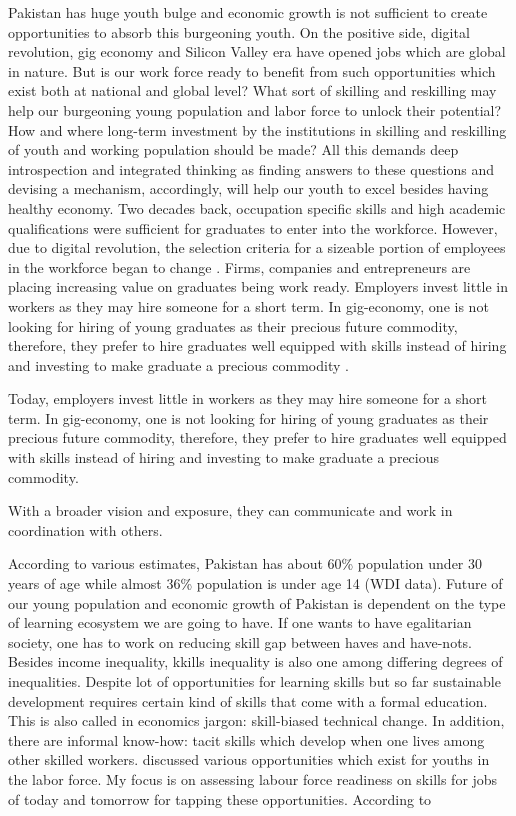 \documentclass[
]{aft}
\begin{document}
Pakistan has huge youth bulge and economic growth is not sufficient to
create opportunities to absorb this burgeoning youth. On the positive
side, digital revolution, gig economy and Silicon Valley era have opened
jobs which are global in nature. But is our work force ready to benefit
from such opportunities which exist both at national and global level?
What sort of skilling and reskilling may help our burgeoning young
population and labor force to unlock their potential? How and where
long-term investment by the institutions in skilling and reskilling of
youth and working population should be made? All this demands deep
introspection and integrated thinking as finding answers to these
questions and devising a mechanism, accordingly, will help our youth to
excel besides having healthy economy. Two decades back, occupation
specific skills and high academic qualifications were sufficient for
graduates to enter into the workforce. However, due to digital
revolution, the selection criteria for a sizeable portion of employees
in the workforce began to change \citet{assessme2015} . Firms, companies
and entrepreneurs are placing increasing value on graduates being work
ready. Employers invest little in workers as they may hire someone for a
short term. In gig-economy, one is not looking for hiring of young
graduates as their precious future commodity, therefore, they prefer to
hire graduates well equipped with skills instead of hiring and investing
to make graduate a precious commodity \citet{akdere2018} .

Today, employers invest little in workers as they may hire someone for a
short term. In gig-economy, one is not looking for hiring of young
graduates as their precious future commodity, therefore, they prefer to
hire graduates well equipped with skills instead of hiring and investing
to make graduate a precious commodity.

With a broader vision and exposure, they can communicate and work in
coordination with others.

According to various estimates, Pakistan has about 60\% population under
30 years of age while almost 36\% population is under age 14 (WDI data).
Future of our young population and economic growth of Pakistan is
dependent on the type of learning ecosystem we are going to have. If one
wants to have egalitarian society, one has to work on reducing skill gap
between haves and have-nots. Besides income inequality, kkills
inequality is also one among differing degrees of inequalities. Despite
lot of opportunities for learning skills but so far sustainable
development requires certain kind of skills that come with a formal
education. This is also called in economics jargon: skill-biased
technical change. In addition, there are informal know-how: tacit skills
which develop when one lives among other skilled workers.
\citet{Haque2022} discussed various opportunities which exist for youths
in the labor force. My focus is on assessing labour force readiness on
skills for jobs of today and tomorrow for tapping these opportunities.
According to \citet{Haque2022}
\end{document}
